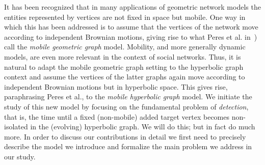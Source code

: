 It has been recognized that in many applications of geometric network models the entities represented by vertices are not fixed in space but mobile. One way in which this has been addressed is to assume that the vertices of the network move according to independent Brownian motions, giving rise to what Peres et al. in~\cite{Peres2010}) call the \emph{mobile geometric graph} model.
Mobility, and more generally dynamic models, are even more relevant in the context of social networks. Thus, it is natural to adapt the mobile geometric graph setting to the hyperbolic graph context and assume the vertices of the latter graphs again move according to independent Brownian motions but in hyperbolic space. This gives rise, paraphrasing Peres et al., to the \emph{mobile hyperbolic graph} model. 
We initiate the study of this new model by focusing on the fundamental
problem of \emph{detection}, that is, the time until a fixed (non-mobile) added target vertex becomes non-isolated in the (evolving) hyperbolic graph.
We will do this; but in fact do much more. In order to discuss our contributions in detail we first need to precisely describe the model we introduce and formalize the main problem we address in our study. 




